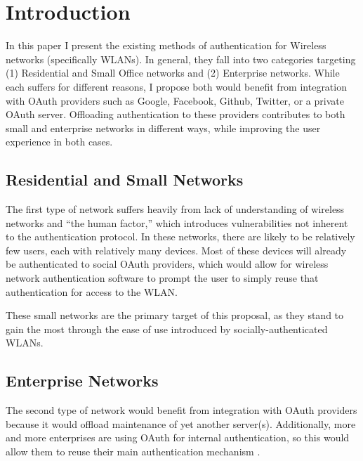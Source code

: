 \section{Introduction}
\label{section:introduction}
In this paper I present the existing methods of authentication for Wireless networks (specifically
WLANs). In general, they fall into two categories targeting (1) Residential and Small Office
networks and (2) Enterprise networks. While each suffers for different reasons, I propose both would
benefit from integration with OAuth providers such as Google, Facebook, Github, Twitter, or a
private OAuth server. Offloading authentication to these providers contributes to both small and
enterprise networks in different ways, while improving the user experience in both cases.

\subsection{Residential and Small Networks}
The first type of network suffers heavily from lack of understanding of wireless networks and
``the human factor,'' which introduces vulnerabilities not inherent to the authentication protocol.
In these networks, there are likely to be relatively few users, each with relatively many devices.
Most of these devices will already be authenticated to social OAuth providers, which would allow
for wireless network authentication software to prompt the user to simply reuse that authentication
for access to the WLAN.

These small networks are the primary target of this proposal, as they stand to gain the most through
the ease of use introduced by socially-authenticated WLANs.

\subsection{Enterprise Networks}
The second type of network would benefit from integration with OAuth providers because it would
offload maintenance of yet another server(s). Additionally, more and more enterprises are using
OAuth for internal authentication, so this would allow them to reuse their main authentication
mechanism \cite{todo:OAuthEnterprise}.
